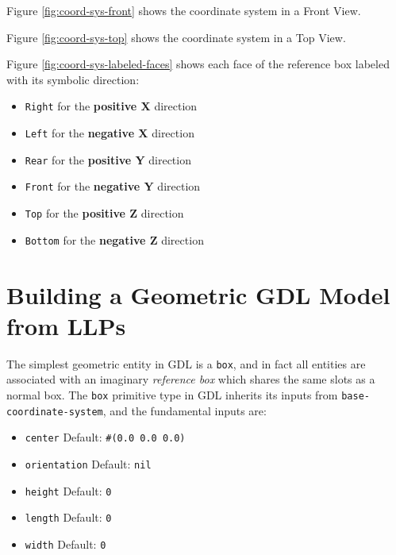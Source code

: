 \documentclass [11pt]{book}
\begin{document}
Figure 
\ref{fig:coord-sys-front} shows the coordinate system in a Front View.



Figure 
\ref{fig:coord-sys-top} shows the coordinate system in a Top View.



Figure 
\ref{fig:coord-sys-labeled-faces} shows each face of the reference box labeled with its symbolic direction:

\begin{itemize}

\item \texttt{Right} for the 
\textbf{positive X} direction

\item \texttt{Left} for the 
\textbf{negative X} direction

\item \texttt{Rear} for the 
\textbf{positive Y} direction

\item \texttt{Front} for the 
\textbf{negative Y} direction

\item \texttt{Top} for the 
\textbf{positive Z} direction

\item \texttt{Bottom} for the 
\textbf{negative Z} direction

\end{itemize}





\section{Building a Geometric GDL Model from LLPs}

\label{sec:buildingageometricgdlmodelfromllps}

The simplest geometric entity in GDL is a \texttt{box}, and in fact all entities are associated with an imaginary \emph{reference box} which shares the same slots as a normal box. The \texttt{box} primitive type in GDL inherits its inputs from \texttt{base-coordinate-system}, and the fundamental inputs are:

\begin{itemize}

\item \texttt{center} Default: \texttt{\#(0.0 0.0 0.0)}

\item \texttt{orientation} Default: \texttt{nil}

\item \texttt{height} Default: \texttt{0}

\item \texttt{length} Default: \texttt{0}

\item \texttt{width} Default: \texttt{0}

\end{itemize}
\end{document}
